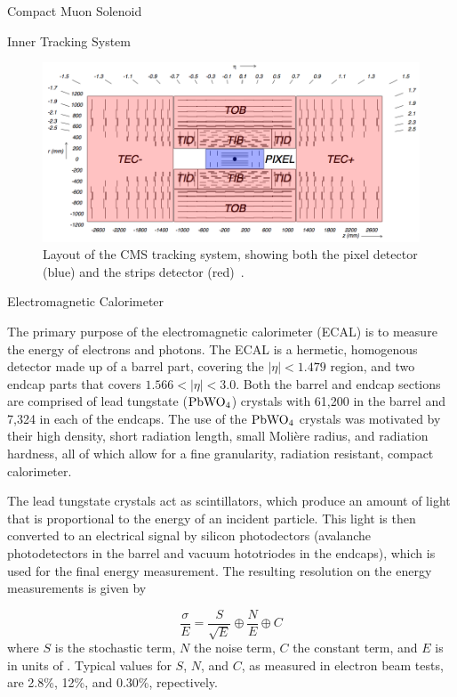 \begin{section}{Compact Muon Solenoid}
\begin{subsection}{Inner Tracking System}
\begin{figure}[tbp!]
\begin{center}
\includegraphics[angle=0,width=0.80\columnwidth]{fig/cms_tracker.png}
\end{center}
\caption{Layout of the CMS tracking system, showing both the pixel detector (blue) and the strips detector (red)~\cite{Lenzi:2013xpa}.}
\label{fig:cms_tracker}
\end{figure}

\end{subsection}

\begin{subsection}{Electromagnetic Calorimeter}

The primary purpose of the electromagnetic calorimeter (ECAL) is to measure the energy of electrons and photons.
The ECAL is a hermetic, homogenous detector made up of a barrel part, covering the $|\eta| < 1.479$ region, and two endcap parts that covers $1.566 < |\eta| < 3.0$.
Both the barrel and endcap sections are comprised of lead tungstate ($\mathrm{PbWO_{4}}$) crystals with 61,200 in the barrel and 7,324 in each of the endcaps.
The use of the $\mathrm{PbWO_{4}}$ crystals was motivated by their high density, short radiation length, small Moli\`ere radius, and radiation hardness, all of which allow for a fine granularity, radiation resistant, compact calorimeter.

The lead tungstate crystals act as scintillators, which produce an amount of light that is proportional to the energy of an incident particle.
This light is then converted to an electrical signal by silicon photodectors (avalanche photodetectors in the barrel and vacuum hototriodes in the endcaps), which is used for the final energy measurement.
The resulting resolution on the energy measurements is given by 

\begin{equation}
\label{eq:ecal_resolution}
\frac{\sigma}{E} = \frac{S}{\sqrt{E}} \oplus \frac{N}{E} \oplus C
\end{equation}
where $S$ is the stochastic term, $N$ the noise term, $C$ the constant term, and $E$ is in units of \GeV.
Typical values for $S$, $N$, and $C$, as measured in electron beam tests, are 2.8\%, 12\%, and 0.30\%, repectively.


\end{subsection}
\end{section}
